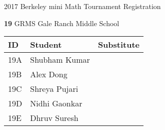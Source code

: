 \documentclass[12pt]{amsart}
\begin{document}
\newpage



\renewcommand{\TeamID}{19}
\renewcommand{\TeamName}{GRMS}
\renewcommand{\SchoolName}{Gale Ranch Middle School}
\renewcommand{\IDA}{19A}
\renewcommand{\IDB}{19B}
\renewcommand{\IDC}{19C}
\renewcommand{\IDD}{19D}
\renewcommand{\IDE}{19E}
\renewcommand{\StudentA}{Shubham Kumar}
\renewcommand{\StudentB}{Alex Dong}
\renewcommand{\StudentC}{Shreya Pujari}
\renewcommand{\StudentD}{Nidhi Gaonkar}
\renewcommand{\StudentE}{Dhruv Suresh}

\begin{center}
{\sc \Large 2017 Berkeley mini Math Tournament Registration}

\bigskip
\bigskip

{\bf \Large  \TeamID} \hfill {\large \TeamName} \hfill {\large \SchoolName}

\bigskip
\bigskip

\begin{tabular}{| p{} | p{} | p{} |}
\hline
\bf ID         & \bf Student             & \bf Substitute             \\ \hline
\IDA           & \StudentA               &                            \\ \hline
\IDB           & \StudentB               &                            \\ \hline
\IDC           & \StudentC               &                            \\ \hline
\IDD           & \StudentD               &                            \\ \hline
\IDE           & \StudentE               &                            \\ \hline
\end{tabular} 
\end{center}
\bigskip
\bigskip

\newpage



\renewcommand{\TeamID}{20}
\renewcommand{\TeamName}{GRMS 2}
\renewcommand{\SchoolName}{Gale Ranch Middle School}
\renewcommand{\IDA}{20A}
\renewcommand{\IDB}{20B}
\renewcommand{\IDC}{20C}
\renewcommand{\IDD}{}
\renewcommand{\IDE}{}
\renewcommand{\StudentA}{Radhika Patwardhan}
\renewcommand{\StudentB}{Arav Bhattacharya}
\renewcommand{\StudentC}{Adi Kumar}
\renewcommand{\StudentD}{}
\renewcommand{\StudentE}{}
\end{document}
